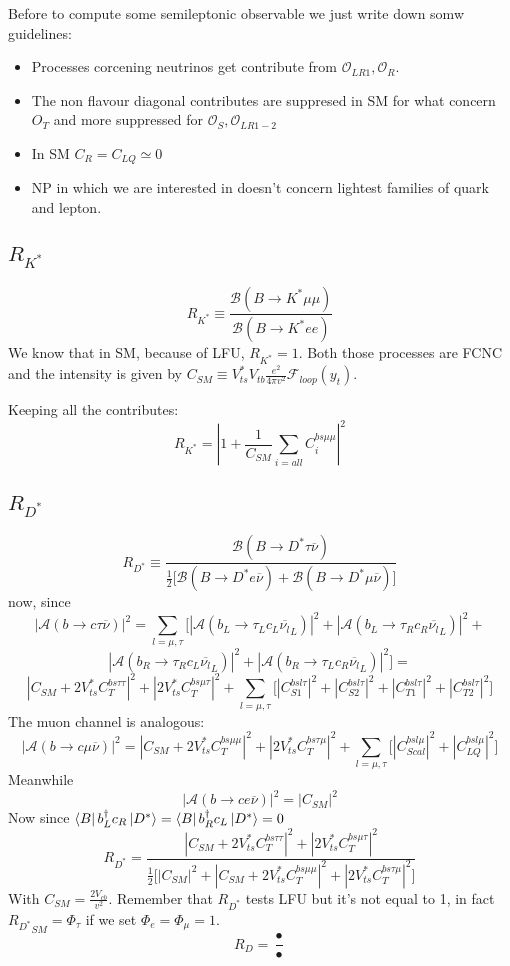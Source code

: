 \documentclass{article}
\begin{document}
Before to compute some semileptonic observable we just write down somw guidelines:
\begin{itemize}
\item Processes corcening neutrinos get contribute from $\mathcal{O}_{LR1}, \mathcal{O}_R$.
\item The non flavour diagonal contributes are suppresed in SM for what concern $O_T$ and more suppressed for $\mathcal{O}_S, \mathcal{O}_{LR1-2} $
\item In SM $C_R= C_{LQ} \simeq 0$
\item NP in which we are interested in doesn't concern lightest families of quark and lepton.
\end{itemize}


\subsection{$R_{K^*}$}
\[
R_{K^*} \equiv \frac{\mathcal{B}(B \rightarrow K^* \mu \mu)}{\mathcal{B}(B \rightarrow K^* e e )}
\]
We know that in SM, because of LFU, $R_{K^*}=1$. Both those processes are FCNC and the intensity is given by $C_{SM} \equiv V_{ts}^* V_{tb} \frac{e^2}{4 \pi v^2} \mathcal{F}_{loop}(y_t)$.

Keeping all the contributes:
\[
R_{K^*} =|1+ \frac{1}{C_{SM}}  \sum_{i=all} C_i^{bs \mu \mu}  |^2
\]

\subsection{$R_{D^*}$}
\[
R_{D^*} \equiv \frac{\mathcal{B}(B \rightarrow D^* \tau  \overline{\nu})}{\frac{1}{2} \big[ \mathcal{B}(B \rightarrow D^* e \overline{\nu} ) + \mathcal{B}(B \rightarrow D^* \mu \overline{\nu} )  \big] }
\]
now, since
\[
|\mathcal{A}(b \rightarrow c \tau \overline{\nu})|^2= \sum_{l=\mu, \tau} \big[|\mathcal{A}(b_L \rightarrow \tau_L c_L \overline{\nu_l}_L)|^2 + |\mathcal{A}(b_L \rightarrow \tau_R c_R \overline{\nu_l}_L)|^2 + 
\]
\[
|\mathcal{A}(b_R \rightarrow \tau_R c_L \overline{\nu_l}_L)|^2 + |\mathcal{A}(b_R \rightarrow \tau_L c_R \overline{\nu_l}_L)|^2  \big]=
\]
\[
|C_{SM} + 2V^*_{ts} C_T^{bs\tau\tau}|^2 + |2V^*_{ts} C_T^{bs\mu\tau}|^2 
+ \sum_{l=\mu, \tau} \big[| C^{bsl\tau}_{S1}|^2 +  |C^{bsl\tau}_{S2}|^2 + |C^{bsl\tau}_{T1}|^2 + |C^{bsl\tau}_{T2}|^2\big]
\]
The muon channel is analogous:
\[
|\mathcal{A}(b\rightarrow c \mu \overline{\nu} )|^2 = 
|C_{SM} + 2V^*_{ts}C_T^{bs\mu\mu}|^2 + |2V^*_{ts}C_T^{bs\tau\mu}|^2 
+ \sum_{l=\mu, \tau} \big[| C^{bsl\mu}_{Scal}|^2 +  |C^{bsl\mu}_{LQ}|^2\big]
\]
Meanwhile
\[
|\mathcal{A}(b\rightarrow c e \overline{\nu} )|^2 = |C_{SM}|^2 
\]
Now since $\bra{B} b_L^\dagger c_R\ket{D^*}=\bra{B} b_R^\dagger c_L\ket{D^*}=0$
\[
R_{D^*}=\frac{|C_{SM} + 2V^*_{ts} C_T^{bs\tau\tau}|^2 + |2V^*_{ts} C_T^{bs\mu\tau}|^2 }{\frac{1}{2}\big[ |C_{SM}|^2 +|C_{SM} + 2V^*_{ts}C_T^{bs\mu\mu}|^2 + |2V^*_{ts}C_T^{bs\tau\mu}|^2\big]}
\]
With $C_{SM}= \frac{2V_{cb}}{v^2}$. Remember that $R_{D^*}$ tests LFU but it's not equal to 1, in fact ${R_{D^*}}_{SM} = \Phi_\tau$ if we set $\Phi_e=\Phi_\mu=1$.\\
\[
R_{D}= \frac{•}{•}
\]
\end{document}

